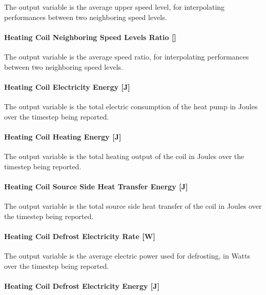The output variable is the average upper speed level, for interpolating performances between two neighboring speed levels.

\paragraph{Heating Coil Neighboring Speed Levels Ratio {[]}}\label{heating-coil-neighboring-speed-levels-ratio}

The output variable is the average speed ratio, for interpolating performances between two neighboring speed levels.

\paragraph{Heating Coil Electricity Energy {[}J{]}}\label{heating-coil-electric-energy-j-4}

The output variable is the total electric consumption of the heat pump in Joules over the timestep being reported.

\paragraph{Heating Coil Heating Energy {[}J{]}}\label{heating-coil-heating-energy-j-9}

The output variable is the total heating output of the coil in Joules over the timestep being reported.

\paragraph{Heating Coil Source Side Heat Transfer Energy {[}J{]}}\label{heating-coil-source-side-heat-transfer-energy-j-1}

The output variable is the total source side heat transfer of the coil in Joules over the timestep being reported.

\paragraph{Heating Coil Defrost Electricity Rate {[}W{]}}\label{heating-coil-defrost-electric-powerw}

The output variable is the average electric power used for defrosting, in Watts over the timestep being reported.

\paragraph{Heating Coil Defrost Electricity Energy {[}J{]}}\label{heating-coil-defrost-electric-energy-j-2}

